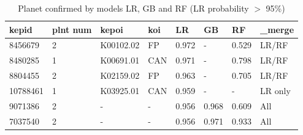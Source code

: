 \begin{table}[!htbp]
 \centering
 \caption{Planet confirmed by models LR, GB and RF (LR probability $>$ 95\%)}
 \label{dataLRGBRFcreftab} 
  \begin{tabular}
{| 
 p{}| 
 p{}| 
 p{}| 
 p{}| 
 p{}| 
 p{}| 
 p{}| 
 p{}| 
}\hline 
\textbf{kepid} &\textbf{plnt num} &\textbf{kepoi} &\textbf{koi} &\textbf{LR} &\textbf{GB} &\textbf{RF} &\textbf{\_merge} \\ \hline 
8456679 &2 &K00102.02 &FP &0.972 &- &0.529 &LR/RF\\ \hline 
8480285 &1 &K00691.01 &CAN &0.971 &- &0.798 &LR/RF\\ \hline 
8804455 &2 &K02159.02 &FP &0.963 &- &0.705 &LR/RF\\ \hline 
10788461 &1 &K03925.01 &CAN &0.959 &- &- &LR only\\ \hline 
9071386 &2 &- &- &0.956 &0.968 &0.609 &All\\ \hline 
7037540 &2 &- &- &0.956 &0.971 &0.933 &All\\ \hline 
\end{tabular} 
\end{table}